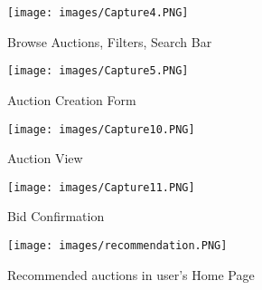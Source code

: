 \documentclass{article}
\begin{document}
\begin{figure}[htp]
    \centering
    \texttt{[image: images/Capture4.PNG]}
    \caption{Browse Auctions, Filters, Search Bar}
    \label{fig:galaxy}
\end{figure}

\begin{figure}[htp]
    \centering
    \texttt{[image: images/Capture5.PNG]}
    \caption{Auction Creation Form}
    \label{fig:galaxy}
\end{figure}


\begin{figure}[htp]
    \centering
    \texttt{[image: images/Capture10.PNG]}
    \caption{Auction View}
    \label{fig:galaxy}
\end{figure}

\begin{figure}[htp]
    \centering
    \texttt{[image: images/Capture11.PNG]}
    \caption{Bid Confirmation}
    \label{fig:galaxy}
\end{figure}

\begin{figure}[htp]
    \centering
    \texttt{[image: images/recommendation.PNG]}
    \caption{Recommended auctions in user's Home Page}
    \label{fig:galaxy}
\end{figure}
\end{document}
